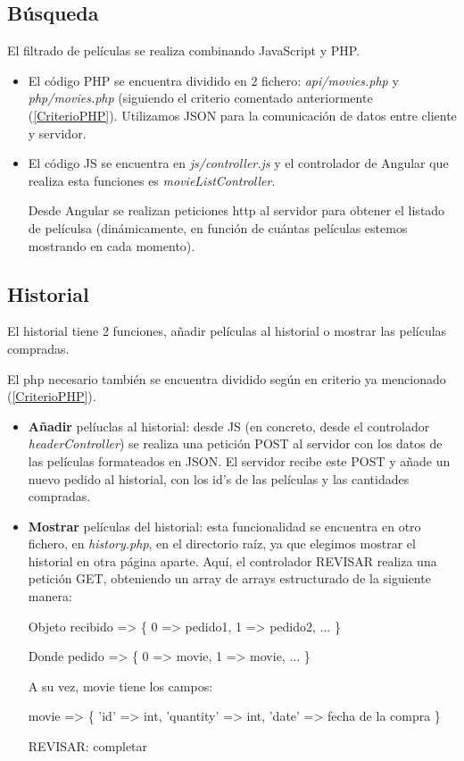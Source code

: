 \documentclass{apuntes}
\begin{document}
\subsection{Búsqueda}
El filtrado de películas se realiza combinando JavaScript y PHP. 

\begin{itemize}
\item El código PHP se encuentra dividido en 2 fichero: \textit{api/movies.php} y \textit{php/movies.php} (siguiendo el criterio comentado anteriormente (\ref{CriterioPHP}). Utilizamos JSON para la comunicación de datos entre cliente y servidor.

\item El código JS se encuentra en \textit{js/controller.js} y el controlador de Angular que realiza esta funciones es \textit{movieListController}.

Desde Angular se realizan peticiones http al servidor para obtener el listado de películsa (dinámicamente, en función de cuántas películas estemos mostrando en cada momento). 

\end{itemize}



\subsection{Historial}

El historial tiene 2 funciones, añadir películas al historial o mostrar las películas compradas. 

El php necesario también se encuentra dividido según en criterio ya mencionado (\ref{CriterioPHP}).

\begin{itemize}
\item \textbf{Añadir} pelíuclas al historial: desde JS (en concreto, desde el controlador \textit{headerController}) se realiza una petición POST al servidor con los datos de las películas formateados en JSON. El servidor recibe este POST y añade un nuevo pedido al historial, con los id's de las películas y las cantidades compradas. 

\item \textbf{Mostrar} películas del historial: esta funcionalidad se encuentra en otro fichero, en \textit{history.php}, en el directorio raíz, ya que elegimos mostrar el historial en otra página aparte. Aquí, el controlador REVISAR realiza una petición GET, obteniendo un array de arrays estructurado de la siguiente manera:

Objeto recibido => \{
		0 => pedido1,
		1 => pedido2,
		...
	\}
	
Donde pedido => \{
	0 => movie,
	1 => movie,
	...
\}

A su vez, movie tiene los campos:

movie => \{
	'id' => int,
	'quantity' => int,
	'date' => fecha de la compra
\}

REVISAR: completar

\end{itemize}
\end{document}
